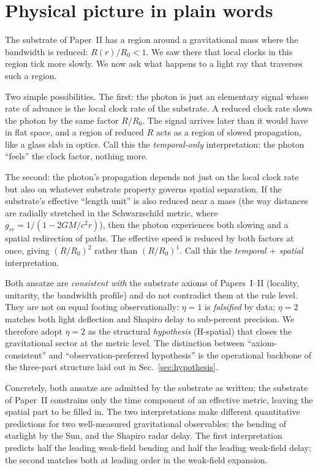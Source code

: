 \documentclass[11pt,a4paper]{article}
\begin{document}
\section{Physical picture in plain words}
\label{sec:picture}

The substrate of Paper~II has a region around a gravitational
mass where the bandwidth is reduced: $R(r)/R_0 < 1$. We saw there
that local clocks in this region tick more slowly. We now ask
what happens to a light ray that traverses such a region.

Two simple possibilities. The first: the photon is just an
elementary signal whose rate of advance is the local clock rate
of the substrate. A reduced clock rate slows the photon by the
same factor $R/R_0$. The signal arrives later than it would have
in flat space, and a region of reduced $R$ acts as a region of
slowed propagation, like a glass slab in optics. Call this the
\emph{temporal-only} interpretation: the photon ``feels'' the
clock factor, nothing more.

The second: the photon's propagation depends not just on the
local clock rate but also on whatever substrate property
governs spatial separation. If the substrate's effective
``length unit'' is also reduced near a mass (the way distances
are radially stretched in the Schwarzschild metric, where
$g_{rr} = 1/(1 - 2GM/c^2 r)$), then the photon experiences both
slowing and a spatial redirection of paths. The effective speed
is reduced by both factors at once, giving $(R/R_0)^2$ rather
than $(R/R_0)^1$. Call this the \emph{temporal $+$ spatial}
interpretation.

Both ansatze are \emph{consistent with} the substrate axioms
of Papers~I--II (locality, unitarity, the bandwidth profile)
and do not contradict them at the rule level. They are not on
equal footing observationally: $\eta = 1$ is \emph{falsified}
by data; $\eta = 2$ matches both light deflection and Shapiro
delay to sub-percent precision. We therefore adopt
$\eta = 2$ as the structural \emph{hypothesis} (H-spatial)
that closes the gravitational sector at the metric level. The
distinction between ``axiom-consistent'' and
``observation-preferred hypothesis'' is the operational
backbone of the three-part structure laid out in
Sec.~\ref{sec:hypothesis}.

Concretely, both ansatze are admitted by the substrate as
written; the substrate of Paper~II constrains only the time
component of an effective metric, leaving the spatial part to
be filled in. The two interpretations make different
quantitative predictions for two well-measured gravitational
observables: the bending of starlight by the Sun, and the
Shapiro radar delay. The first interpretation predicts half the
leading weak-field bending and half the leading weak-field delay; the second
matches both at leading order in the weak-field expansion.
\end{document}
